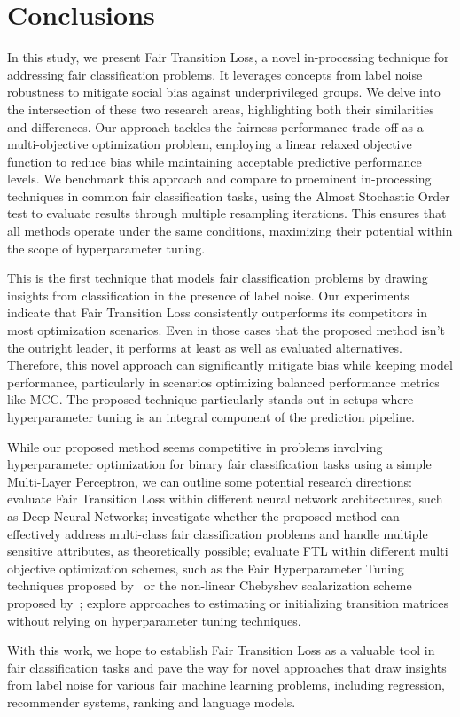 \chapter{Conclusions}

\label{sec:conclusions}

In this study, we present Fair Transition Loss, a novel in-processing technique for addressing fair classification problems. It leverages concepts from label noise robustness to mitigate social bias against underprivileged groups. We delve into the intersection of these two research areas, highlighting both their similarities and differences. Our approach tackles the fairness-performance trade-off as a multi-objective optimization problem, employing a linear relaxed objective function to reduce bias while maintaining acceptable predictive performance levels. We benchmark this approach and compare to proeminent in-processing techniques in common fair classification tasks, using the Almost Stochastic Order test to evaluate results through multiple resampling iterations. This ensures that all methods operate under the same conditions, maximizing their potential within the scope of hyperparameter tuning.

This is the first technique that models fair classification problems by drawing insights from classification in the presence of label noise. Our experiments indicate that Fair Transition Loss consistently outperforms its competitors in most optimization scenarios. Even in those cases that the proposed method isn't the outright leader, it performs at least as well as evaluated alternatives. Therefore, this novel approach can significantly mitigate bias while keeping model performance, particularly in scenarios optimizing balanced performance metrics like MCC. The proposed technique particularly stands out in setups where hyperparameter tuning is an integral component of the prediction pipeline.

While our proposed method seems competitive in problems involving hyperparameter optimization for binary fair classification tasks using a simple Multi-Layer Perceptron, we can outline some potential research directions: evaluate Fair Transition Loss within different neural network architectures, such as Deep Neural Networks; investigate whether the proposed method can effectively address multi-class fair classification problems and handle multiple sensitive attributes, as theoretically possible; evaluate FTL within different multi objective optimization schemes, such as the Fair Hyperparameter Tuning techniques proposed by~\cite{Cruz2021} or the non-linear Chebyshev scalarization scheme proposed by~\cite{Wei2022}; explore approaches to estimating or initializing transition matrices without relying on hyperparameter tuning techniques. 

With this work, we hope to establish Fair Transition Loss as a valuable tool in fair classification tasks and pave the way for novel approaches that draw insights from label noise for various fair machine learning problems, including regression, recommender systems, ranking and language models.
